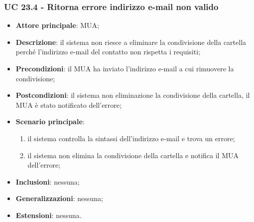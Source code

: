     \subsubsection{UC 23.4 - Ritorna errore indirizzo e-mail non valido} \label{sec:UC23.4}
    \begin{itemize}
        \item \textbf{Attore principale}: MUA;
        \item \textbf{Descrizione}: il sistema non riesce a eliminare la condivisione della cartella perché l'indirizzo e-mail del contatto non rispetta i requisiti;
        \item \textbf{Precondizioni}: il MUA ha inviato l'indirizzo e-mail a cui rimuovere la condivisione;
        \item \textbf{Postcondizioni}: il sistema non eliminazione la condivisione della cartella, il MUA è stato notificato dell'errore;
        \item \textbf{Scenario principale}:
            \begin{enumerate}
                \item il sistema controlla la sintassi dell'indirizzo e-mail e trova un errore;
                \item il sistema non elimina la condivisione della cartella e notifica il MUA dell'errore;
            \end{enumerate}
        \item \textbf{Inclusioni}: nessuna;
        \item \textbf{Generalizzazioni}: nessuna;
        \item \textbf{Estensioni}: nessuna.
    \end{itemize}
